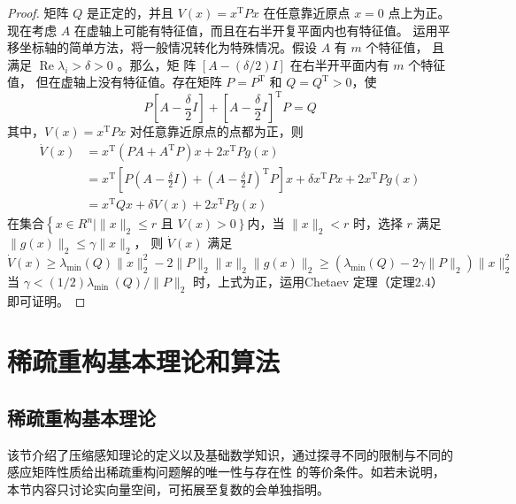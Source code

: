 \begin{proof}
    矩阵 $Q$ 是正定的，并且 $V(x)=x^{\mathrm{T}} P x$ 在任意靠近原点 $x=0$ 点上为正。
    现在考虑 $A$ 在虚轴上可能有特征值，而且在右半开复平面内也有特征值。
    运用平移坐标轴的简单方法，将一般情况转化为特殊情况。假设 $A$ 有 $m$ 个特征值，
    且满足 $\operatorname{Re} \lambda_i>\delta>0$ 。那么，矩 阵 $[A-(\delta / 2) I]$ 在右半开平面内有 $m$ 个特征值，
    但在虚轴上没有特征值。存在矩阵 $P=P^{\mathrm{T}}$ 和 $Q=Q^{\mathrm{T}}>0$，使
    \begin{equation}
        P\left[A-\frac{\delta}{2} I\right]+\left[A-\frac{\delta}{2} I\right]^{\mathrm{T}} P=Q
    \end{equation}
    其中，$V(x)=x^{\mathrm{T}} P x$ 对任意靠近原点的点都为正，则
    \begin{equation}
        \begin{aligned}
        \dot{V}(x) & =x^{\mathrm{T}}\left(P A+A^{\mathrm{T}} P\right) x+2 x^{\mathrm{T}} P g(x) \\
        & =x^{\mathrm{T}}\left[P\left(A-\frac{\delta}{2} I\right)+\left(A-\frac{\delta}{2} I\right)^{\mathrm{T}} P\right] x+\delta x^{\mathrm{T}} P x+2 x^{\mathrm{T}} P g(x) \\
        & =x^{\mathrm{T}} Q x+\delta V(x)+2 x^{\mathrm{T}} P g(x)
        \end{aligned}
    \end{equation}
    在集合$\left\{x \in R^n \mid\|x\|_2 \leqslant r\right.$ 且 $\left.V(x)>0\right\}$内，当 $\|x\|_2<r$ 时，选择 $r$ 满足 $\|g(x)\|_2 \leqslant \gamma\|x\|_2$，
    则 $\dot{V}(x)$ 满足
    \begin{equation}
        \dot{V}(x) \geqslant \lambda_{\min }(Q)\|x\|_2^2-2\|P\|_2\|x\|_2\|g(x)\|_2 \geqslant\left(\lambda_{\min }(Q)-2 \gamma\|P\|_2\right)\|x\|_2^2
    \end{equation}
    当 $\gamma<(1 / 2) \lambda_{\text {min }}(Q) /\|P\|_2$ 时，上式为正，运用Chetaev 定理（定理2.4）即可证明。
\end{proof}

\section{稀疏重构基本理论和算法}
\subsection{稀疏重构基本理论}
该节介绍了压缩感知理论的定义以及基础数学知识，通过探寻不同的限制与不同的感应矩阵性质给出稀疏重构问题解的唯一性与存在性
的等价条件。如若未说明，本节内容只讨论实向量空间，可拓展至复数的会单独指明。
